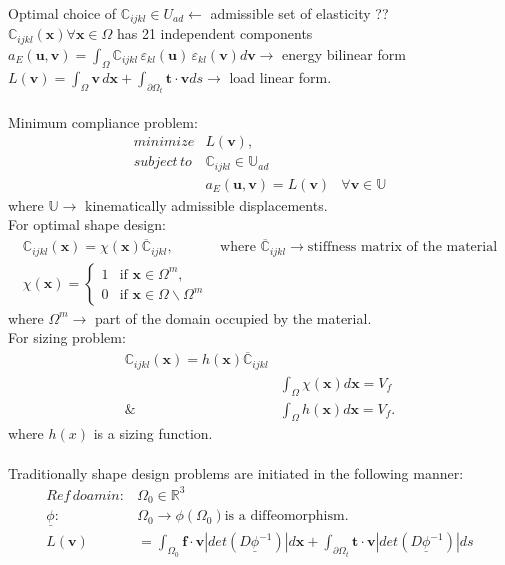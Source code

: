 \documentclass[10pt]{article}
\begin{document}
Optimal choice of $\mathbb{C}_{ijkl} \in U_{ad} \leftarrow $ admissible set of elasticity ??\\
$\mathbb{C}_{ijkl}(\textbf{x}) \forall \textbf{x} \in \Omega $ has 21 independent components\\
$a_E(\textbf{u}, \textbf{v}) = \int_\Omega \mathbb{C}_{ijkl}\,\varepsilon_{kl}(\textbf{u})\,\varepsilon_{kl}(\textbf{v})d\textbf{v} \rightarrow $ energy bilinear form\\
$L(\textbf{v}) = \int_\Omega \textbf{v}\, d\textbf{x}+\int_{\partial\Omega_t} \textbf{t}\cdot\textbf{v}ds \rightarrow $ load linear form.\\
\\
Minimum compliance problem:
\begin{eqnarray}
minimize & L(\textbf{v}),\\
subject\, to & \mathbb{C}_{ijkl} \in \mathbb{U}_{ad}\\
		  & a_E(\textbf{u}, \textbf{v}) = L(\textbf{v}) &\forall \textbf{v} \in \mathbb{U} 
\end{eqnarray}
where $\mathbb{U}\rightarrow $ kinematically admissible displacements.\\
For optimal shape design:
\begin{eqnarray}
\mathbb{C}_{ijkl}(\textbf{x}) = \chi(\textbf{x})\overline{\mathbb{C}}_{ijkl}, & \textrm{where  } \overline{\mathbb{C}}_{ijkl}\rightarrow\textrm{stiffness matrix of the material}\\
\chi(\textbf{x}) =
    \begin{cases}
        1 & \text{if $\textbf{x}\in \Omega^m$,}\\
        0 & \text{if $\textbf{x}\in \Omega\backslash\Omega^m$}
    \end{cases}
\end{eqnarray}
where $\Omega^m \rightarrow$ part of the domain occupied by the material.\\
For sizing problem:
\begin{eqnarray}
\mathbb{C}_{ijkl}(\textbf{x}) = h(\textbf{x})\overline{\mathbb{C}}_{ijkl}\\
& \int_\Omega \chi(\textbf{x})d\textbf{x}=V_f\\
\& & \int_\Omega h(\textbf{x})d\textbf{x}=V_f.
\end{eqnarray}
where $h(x)$ is a sizing function.\\
\\
Traditionally shape design problems are initiated in the following manner:
\begin{align}
Ref\, doamin: & \Omega_0\in \mathbb{R}^3\\
\underline{\phi}:  & \Omega_0 \rightarrow \phi(\Omega_0) \text{is a diffeomorphism.}\\
L(\textbf{v})&=\int_{\Omega_0} \textbf{f}\cdot\textbf{v} |det(D\underline{\phi}^{-1})|d\textbf{x}+\int_{\partial\Omega_t} \textbf{t}\cdot\textbf{v}|det(D\underline{\phi}^{-1})|ds
\end{align}
\end{document}

